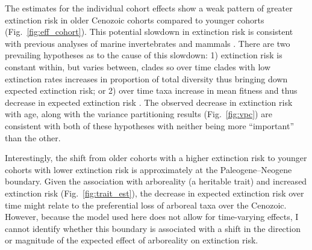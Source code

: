 \documentclass{pnastwo}
\begin{document}
\begin{article}
The estimates for the individual cohort effects show a weak pattern of greater extinction risk in older Cenozoic cohorts compared to younger cohorts (Fig.~\ref{fig:eff_cohort}). This potential slowdown in extinction risk is consistent with previous analyses of marine invertebrates \cite{Raup1982a,Foote2003} and mammals \cite{Alroy2010c,Alroy2000g}. There are two prevailing hypotheses as to the cause of this slowdown: 1) extinction risk is constant within, but varies between, clades so over time clades with low extinction rates increases in proportion of total diversity thus bringing down expected extinction risk; or 2) over time taxa increase in mean fitness and thus decrease in expected extinction risk \cite{Raup1982a}. The observed decrease in extinction risk with age, along with the variance partitioning results (Fig.~\ref{fig:vpc}) are consistent with both of these hypotheses with neither being more ``important'' than the other. 

Interestingly, the shift from older cohorts with a higher extinction risk to younger cohorts with lower extinction risk is approximately at the Paleogene--Neogene boundary. Given the association with arboreality (a heritable trait) and increased extinction risk (Fig.~\ref{fig:trait_est}), the decrease in expected extinction risk over time might relate to the preferential loss of arboreal taxa over the Cenozoic. However, because the model used here does not allow for time-varying effects, I cannot identify whether this boundary is associated with a shift in the direction or magnitude of the expected effect of arboreality on extinction risk.


\end{article}
\end{document}

